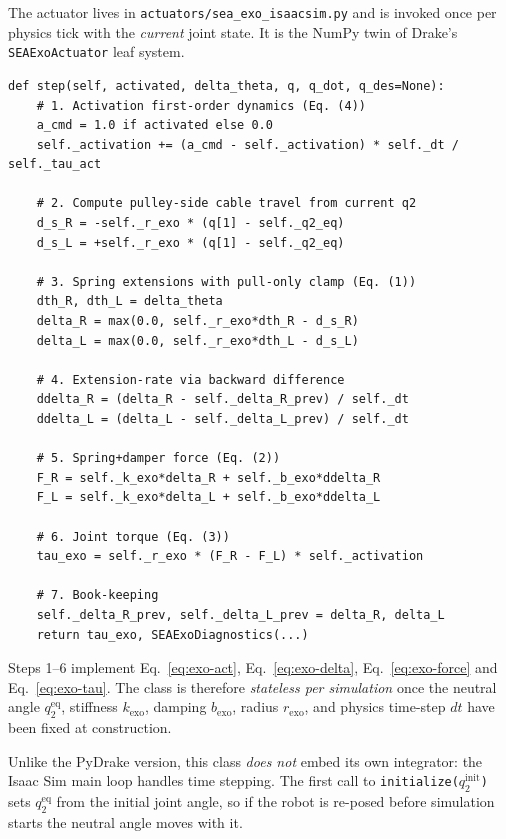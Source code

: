 \documentclass[11pt,a4paper]{article}
\newcommand{\rexo}{r_{\mathrm{exo}}}
\newcommand{\kexo}{k_{\mathrm{exo}}}
\begin{document}
The actuator lives in \texttt{actuators/sea\_exo\_isaacsim.py} and is
invoked once per physics tick with the \emph{current} joint state.
It is the NumPy twin of Drake's \texttt{SEAExoActuator} leaf system.

\begin{lstlisting}[caption={\texttt{actuators/sea\_exo\_isaacsim.py} -- stepping equations.}]
def step(self, activated, delta_theta, q, q_dot, q_des=None):
    # 1. Activation first-order dynamics (Eq. (4))
    a_cmd = 1.0 if activated else 0.0
    self._activation += (a_cmd - self._activation) * self._dt / self._tau_act

    # 2. Compute pulley-side cable travel from current q2
    d_s_R = -self._r_exo * (q[1] - self._q2_eq)
    d_s_L = +self._r_exo * (q[1] - self._q2_eq)

    # 3. Spring extensions with pull-only clamp (Eq. (1))
    dth_R, dth_L = delta_theta
    delta_R = max(0.0, self._r_exo*dth_R - d_s_R)
    delta_L = max(0.0, self._r_exo*dth_L - d_s_L)

    # 4. Extension-rate via backward difference
    ddelta_R = (delta_R - self._delta_R_prev) / self._dt
    ddelta_L = (delta_L - self._delta_L_prev) / self._dt

    # 5. Spring+damper force (Eq. (2))
    F_R = self._k_exo*delta_R + self._b_exo*ddelta_R
    F_L = self._k_exo*delta_L + self._b_exo*ddelta_L

    # 6. Joint torque (Eq. (3))
    tau_exo = self._r_exo * (F_R - F_L) * self._activation

    # 7. Book-keeping
    self._delta_R_prev, self._delta_L_prev = delta_R, delta_L
    return tau_exo, SEAExoDiagnostics(...)
\end{lstlisting}

\begin{codemath}
Steps 1--6 implement Eq.~\eqref{eq:exo-act},
Eq.~\eqref{eq:exo-delta}, Eq.~\eqref{eq:exo-force} and
Eq.~\eqref{eq:exo-tau}.  The class is therefore \emph{stateless
per simulation} once the neutral angle $q_2^{\mathrm{eq}}$,
stiffness $\kexo$, damping $b_{\mathrm{exo}}$, radius $\rexo$, and
physics time-step $dt$ have been fixed at construction.
\end{codemath}

\begin{warnbox}
Unlike the PyDrake version, this class \emph{does not} embed its own
integrator: the Isaac Sim main loop handles time stepping.  The
first call to \texttt{initialize($q_2^{\mathrm{init}}$)} sets
$q_2^{\mathrm{eq}}$ from the initial joint angle, so if the robot is
re-posed before simulation starts the neutral angle moves with it.
\end{warnbox}
\end{document}

